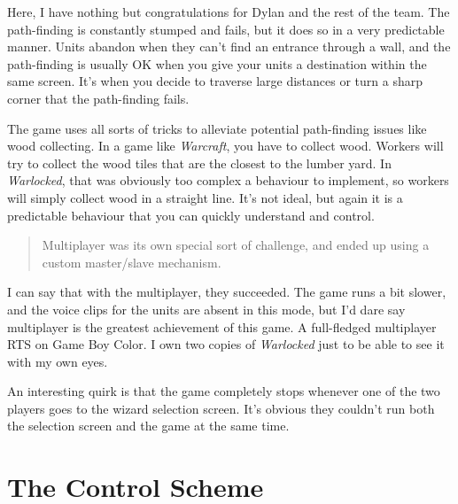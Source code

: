 \documentclass{book}
\begin{document}
Here, I have nothing but congratulations for Dylan and the rest of the team. The path-finding is constantly stumped and fails, but it does so in a very predictable manner. Units abandon when they can’t find an entrance through a wall, and the path-finding is usually OK when you give your units a destination within the same screen. It’s when you decide to traverse large distances or turn a sharp corner that the path-finding fails.\par
\FloatBarrier\vspace{\baselineskip}\begin{figure}[H]\end{figure}
The game uses all sorts of tricks to alleviate potential path-finding issues like wood collecting. In a game like \emph{Warcraft}, you have to collect wood. Workers will try to collect the wood tiles that are the closest to the lumber yard. In \emph{Warlocked}, that was obviously too complex a behaviour to implement, so workers will simply collect wood in a straight line. It’s not ideal, but again it is a predictable behaviour that you can quickly understand and control.\par
\begin{quote}
Multiplayer was its own special sort of challenge, and ended up using a custom master/slave mechanism.\par
\end{quote} \par
I can say that with the multiplayer, they succeeded. The game runs a bit slower, and the voice clips for the units are absent in this mode, but I’d dare say multiplayer is the greatest achievement of this game. A full-fledged multiplayer RTS on Game Boy Color. I own two copies of \emph{Warlocked} just to be able to see it with my own eyes.\par
An interesting quirk is that the game completely stops whenever one of the two players goes to the wizard selection screen. It’s obvious they couldn’t run both the selection screen and the game at the same time.\par
\FloatBarrier\vspace{\baselineskip}\begin{figure}[H]\end{figure}
\FloatBarrier\section*{The Control Scheme}
\end{document}

